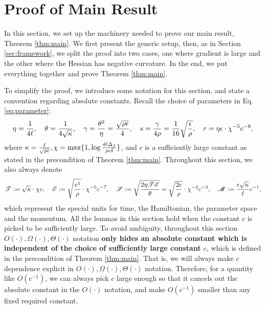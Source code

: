 
\section{Proof of Main Result}
In this section, we set up the machinery needed to prove our main result, Theorem \ref{thm:main}. We first present the generic setup, then, as in Section \ref{sec:framework}, we split the proof into two cases, one where gradient is large and the other where the Hessian has negative curvature. In the end, we put everything together and prove Theorem \ref{thm:main}.

To simplify the proof, we introduce some notation for this section, and state a convention regarding absolute constants. Recall the choice of parameters in Eq.\eqref{eq:parameter}:
\begin{equation*}
\eta = \frac{1}{4\ell}, \quad
\theta = \frac{1}{4\sqrt{\kappa}},
\quad \gamma = \frac{\theta^2}{\eta} = \frac{\sqrt{\rho\epsilon}}{4} ,
\quad s = \frac{\gamma}{4\rho} = \frac{1}{16}\sqrt{\frac{\epsilon}{\rho}}, 
\quad r = \eta\epsilon\cdot \chi^{-5}c^{-8},
\end{equation*}
where $\kappa = \frac{\ell}{\sqrt{\rho\epsilon}}, \chi = \max\{1,  \log \frac{d \ell\Delta_f}{\rho \epsilon\delta}\}$, and $c$ is a sufficiently large constant as stated in the precondition of Theorem \ref{thm:main}.
Throughout this section, we also always denote
\begin{equation*}
\mathscr{T} \mathrel{\mathop:}=  \sqrt{\kappa} \cdot \chi c,  \quad
\mathscr{E} \mathrel{\mathop:}= \sqrt{\frac{\epsilon^3}{\rho}}\cdot \chi^{-5}c^{-7}, \quad \mathscr{S} \mathrel{\mathop:}= \sqrt{\frac{2\eta \mathscr{T}\mathscr{E}}{\theta}} = \sqrt{\frac{2\epsilon}{\rho}} \cdot \chi^{-2}c^{-3}, \quad
\mathscr{M} \mathrel{\mathop:}= \frac{\epsilon \sqrt{\kappa}}{\ell} c^{-1},
\end{equation*}
which represent the special units for time, the Hamiltonian, the parameter space and the momentum.
All the lemmas in this section hold when the constant $c$ is picked to be sufficiently large. To avoid ambiguity, throughout this section $O(\cdot), \Omega(\cdot), \Theta(\cdot)$ notation \textbf{only hides an absolute constant which is independent of the choice of sufficiently large constant $c$}, which is defined in the precondition of Theorem \ref{thm:main}. That is, we will always make $c$ dependence explicit in $O(\cdot), \Omega(\cdot), \Theta(\cdot)$ notation. Therefore, for a quantity like $O(c^{-1})$, we can always pick $c$ large enough so that it cancels out the absolute constant in the $O(\cdot)$ notation, and make $O(c^{-1})$ smaller than any fixed required constant.

